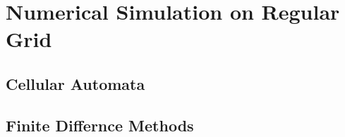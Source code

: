 \section{Numerical Simulation on Regular Grid} 
\subsection{Cellular Automata}
\subsection{Finite Differnce Methods}
